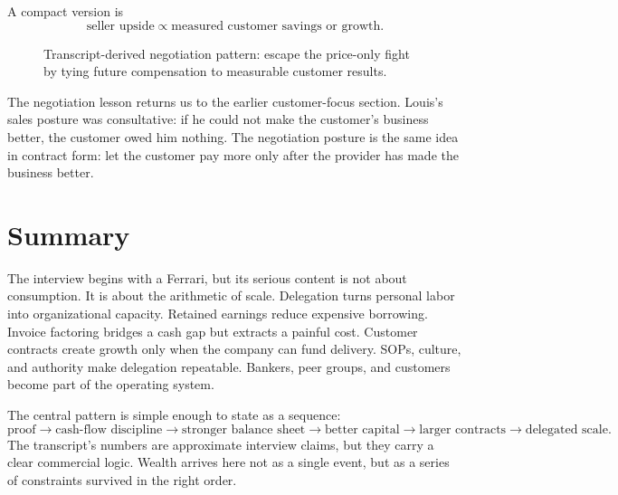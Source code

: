A compact version is
\begin{equation}
\text{seller upside}
\propto
\text{measured customer savings or growth}.
\end{equation}

\begin{figure}
\centering
{}
\caption{Transcript-derived negotiation pattern: escape the price-only fight by tying future compensation to measurable customer results.}
\end{figure}

The negotiation lesson returns us to the earlier customer-focus section. Louis's sales posture was consultative: if he could not make the customer's business better, the customer owed him nothing. The negotiation posture is the same idea in contract form: let the customer pay more only after the provider has made the business better.

\section{Summary}

The interview begins with a Ferrari, but its serious content is not about consumption. It is about the arithmetic of scale. Delegation turns personal labor into organizational capacity. Retained earnings reduce expensive borrowing. Invoice factoring bridges a cash gap but extracts a painful cost. Customer contracts create growth only when the company can fund delivery. SOPs, culture, and authority make delegation repeatable. Bankers, peer groups, and customers become part of the operating system.

The central pattern is simple enough to state as a sequence:
\[
\text{proof}
\rightarrow
\text{cash-flow discipline}
\rightarrow
\text{stronger balance sheet}
\rightarrow
\text{better capital}
\rightarrow
\text{larger contracts}
\rightarrow
\text{delegated scale}.
\]
The transcript's numbers are approximate interview claims, but they carry a clear commercial logic. Wealth arrives here not as a single event, but as a series of constraints survived in the right order.